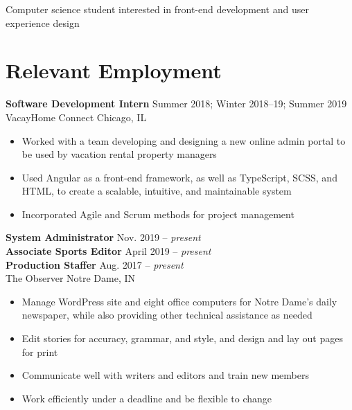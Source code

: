 \documentclass[letterpaper]{article}
\newcommand{\present}[0]{{\itshape present}}
\begin{document}
\hfill
\begin{minipage}[t]{\dimexpr.67\textwidth-.5\columnsep}

\begin{center}
    {\Huge\ttfamily\bfseries \uppercase{}}

    \medskip
    {\large\ttfamily Computer science student interested in front-end development and user experience design}
\end{center}

\section{Relevant Employment}

\textbf{Software Development Intern} \hfill Summer 2018; Winter 2018--19; Summer 2019 \\
VacayHome Connect \hfill Chicago, IL
\begin{itemize}
    \item Worked with a team developing and designing a new online admin portal to be used by vacation rental property managers
    \item Used Angular as a front-end framework, as well as TypeScript, SCSS, and HTML, to create a scalable, intuitive, and maintainable system
    \item Incorporated Agile and Scrum methods for project management
\end{itemize}

\textbf{System Administrator} \hfill Nov. 2019 -- \present{} \\
\textbf{Associate Sports Editor} \hfill April 2019 -- \present{} \\
\textbf{Production Staffer} \hfill Aug. 2017 -- \present{} \\
The Observer \hfill Notre Dame, IN

\begin{itemize}
    \item Manage WordPress site and eight office computers for Notre Dame’s daily newspaper, while also providing other technical assistance as needed
    \item Edit stories for accuracy, grammar, and style, and design and lay out pages for print
    \item Communicate well with writers and editors and train new members
    \item Work efficiently under a deadline and be flexible to change
\end{itemize}


\end{minipage}
\end{document}
